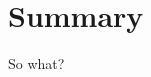 \section{Summary}
%
%
%
%
%
%
\begin{frame}
	\begin{center}
		\Huge So what?
	\end{center}
\end{frame}


